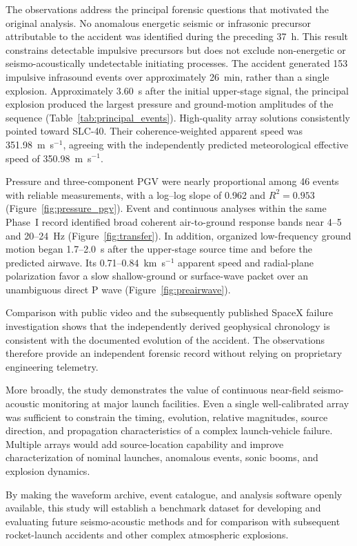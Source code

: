 \documentclass[]{seismica}
\begin{document}
The observations address the principal forensic questions that motivated the
original analysis. No anomalous energetic seismic or infrasonic precursor
attributable to the accident was identified during the preceding 37~h. This
result constrains detectable impulsive precursors but does not exclude
non-energetic or seismo-acoustically undetectable initiating processes. The
accident generated 153 impulsive infrasound events over approximately 26~min,
rather than a single explosion. Approximately 3.60~s after the initial
upper-stage signal, the principal explosion produced the largest pressure and
ground-motion amplitudes of the sequence (Table~\ref{tab:principal_events}).
High-quality array solutions consistently pointed toward SLC-40. Their
coherence-weighted apparent speed was 351.98~m~s$^{-1}$, agreeing with the
independently predicted meteorological effective speed of
350.98~m~s$^{-1}$.

Pressure and three-component PGV were nearly proportional among 46 events with
reliable measurements, with a log--log slope of 0.962 and $R^2=0.953$
(Figure~\ref{fig:pressure_pgv}). Event and continuous analyses within the same
Phase~I record identified broad coherent air-to-ground response bands near
4--5 and 20--24~Hz (Figure~\ref{fig:transfer}). In addition, organized
low-frequency ground motion began 1.7--2.0~s after the upper-stage source time
and before the predicted airwave. Its 0.71--0.84~km~s$^{-1}$ apparent speed and
radial-plane polarization favor a slow shallow-ground or surface-wave packet
over an unambiguous direct P wave (Figure~\ref{fig:preairwave}).

Comparison with public video and the subsequently published SpaceX failure investigation shows that the independently derived geophysical chronology is consistent with the documented evolution of the accident. The observations therefore provide an independent forensic record without relying on proprietary engineering telemetry.

More broadly, the study demonstrates the value of continuous near-field
seismo-acoustic monitoring at major launch facilities. Even a single
well-calibrated array was sufficient to constrain the timing, evolution,
relative magnitudes, source direction, and propagation characteristics of a
complex launch-vehicle failure. Multiple arrays would add source-location
capability and improve characterization of nominal launches, anomalous events,
sonic booms, and explosion dynamics.

By making the waveform archive, event catalogue, and analysis software openly available, this study will establish a benchmark dataset for developing and evaluating future seismo-acoustic methods and for comparison with subsequent rocket-launch accidents and other complex atmospheric explosions.
\end{document}
